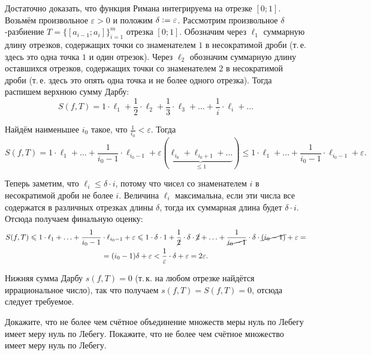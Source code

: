 \begin{solution}
    Достаточно доказать, что функция Римана интегрируема на отрезке $[0; 1]$. Возьмём произвольное $\varepsilon > 0$ и положим $\delta \vcentcolon = \varepsilon$. Рассмотрим произвольное $\delta$-разбиение $T = \{[a_{i - 1}; a_i]\}_{i = 1}^m$ отрезка $[0; 1]$. Обозначим через $\ell_1$ суммарную длину отрезков, содержащих точки со знаменателем $1$ в несократимой дроби (т.\,е. здесь это одна точка $1$ и один отрезок). Через $\ell_2$ обозначим суммарную длину оставшихся отрезков, содержащих точки со знаменателем $2$ в несократимой дроби (т.\,е. здесь это опять одна точка и не более одного отрезка). Тогда распишем верхнюю сумму Дарбу:
    \[
        S(f, T) = 1 \cdot \ell_1 + \frac{1}{2} \cdot \ell_2 + \frac{1}{3} \cdot \ell_3 + \ldots + \frac{1}{i} \cdot \ell_i + \ldots
    \]

    Найдём наименьшее $i_0$ такое, что $\frac{1}{i_0} < \varepsilon$. Тогда
    \[
        S(f, T) = 1 \cdot \ell_1 + \ldots + \frac{1}{i_0 - 1} \cdot \ell_{i_0 - 1} + \varepsilon(\underbrace{\ell_{i_0} + \ell_{i_0 + 1} + \ldots}_{\leqslant 1}) \leqslant 1 \cdot \ell_1 + \ldots + \frac{1}{i_0 - 1} \cdot \ell_{i_0 - 1} + \varepsilon.
    \]

    Теперь заметим, что $\ell_i \leqslant \delta \cdot i$, потому что чисел со знаменателем $i$ в несократимой дроби не более $i$. Величина $\ell_i$ максимальна, если эти числа все содержатся в различных отрезках длины $\delta$, тогда их суммарная длина будет $\delta \cdot i$. Отсюда получаем финальную оценку:
    \begin{multline*}
        S(f, T) \leqslant 1 \cdot \ell_1 + \ldots + \frac{1}{i_0 - 1} \cdot \ell_{i_0 - 1} + \varepsilon \leqslant 1 \cdot \delta \cdot 1 + \frac{1}{\cancel{2}} \cdot \delta \cdot \cancel{2} + \ldots + \frac{1}{\cancel{i_0 - 1}} \cdot \delta \cdot \cancel{(i_0 - 1)} + \varepsilon =\\ = (i_0 - 1)\delta + \varepsilon < \frac{1}{\varepsilon} \cdot \delta + \varepsilon = 2\varepsilon.
    \end{multline*}

    Нижняя сумма Дарбу $s(f, T) = 0$ (т.\,к. на любом отрезке найдётся иррациональное число), так что получаем $s(f, T) = S(f, T) = 0$, отсюда следует требуемое.
\end{solution}

\begin{problem}[4$^\circ$]
    Докажите, что не более чем счётное объединение множеств меры нуль по Лебегу имеет меру нуль по Лебегу. Покажите, что не более чем счётное множество имеет меру нуль по Лебегу.
\end{problem}

